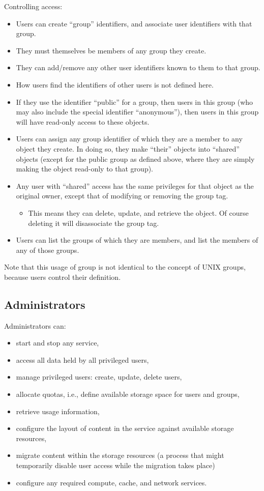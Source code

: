 Controlling access:
\begin{itemize}
	\item Users can create ``group'' identifiers, and associate user identifiers with that group.
	\item They must themselves be members of any group they create.
	\item They can add/remove any other user identifiers known to them to that group.
	\item How users find the identifiers of other users is not defined here.
	\item If they use the identifier ``public'' for a group, then users in this group (who may also include the special identifier ``anonymous''), then users in this group will have read-only access to these objects.
	\item Users can assign any group identifier of which they are a member to any object they create. In doing so, they make ``their'' objects into ``shared'' objects (except for the public group as defined above, where they are simply making the object read-only to that group).
	\item Any user with ``shared'' access has the same privileges for that object as the original owner, except that of modifying or removing the group tag.
	\begin{itemize}
		\item This means they can delete, update, and retrieve the object. Of course deleting it will disassociate the group tag.
	\end{itemize}
	\item Users can list the groups of which they are members, and list the members of any of those groups.
\end{itemize}

Note that this usage of group is not identical to the concept of UNIX groups, because users control their definition.

\subsection*{Administrators}

Administrators can:

\begin{itemize}
	\item  start and stop any service,
	\item  access all data held by all privileged users,
	\item  manage privileged users: create, update, delete users,
	\item  allocate quotas, i.e., define available storage space for users and groups,
	\item  retrieve usage information,
	\item  configure the layout of content in the service against available storage resources,
	\item  migrate content within the storage resources (a process that might temporarily disable user access while the migration takes place)
	\item  configure any required compute, cache, and network services.
\end{itemize}


